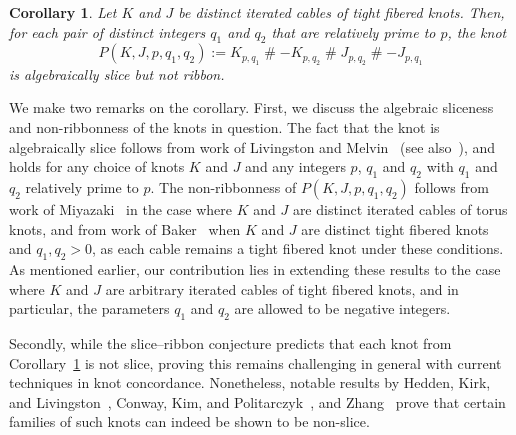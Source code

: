 \documentclass[11pt, reqno]{amsart}
\newtheorem{corollary}[theorem]{Corollary}
\theoremstyle{definition}
\theoremstyle{remark}
\numberwithin{equation}{section}
\begin{document}
\begin{corollary}\label{cor:examples}
Let $K$ and $J$ be distinct iterated cables of tight fibered knots. Then, for each pair of distinct integers $q_1$ and $q_2$ that are relatively prime to $p$, the knot
\[
P(K, J, p, q_1, q_2) := K_{p,q_1} \mathbin{\#} -K_{p,q_2} \mathbin{\#} J_{p,q_2} \mathbin{\#} -J_{p,q_1}
\]
is algebraically slice but not ribbon.
\end{corollary}




We make two remarks on the corollary. 
First, we discuss the algebraic sliceness and non-ribbonness of the knots in question. The fact that the knot is algebraically slice follows from work of Livingston and Melvin~\cite{Livingston-Melvin:1983} (see also~\cite{Kearton:1979}), and holds for any choice of knots $K$ and $J$ and any integers $p$,  $q_1$ and $q_2$ with $q_1$ and $q_2$ relatively prime to $p$.
The non-ribbonness of $P(K, J, p, q_1, q_2)$ follows from work of Miyazaki~\cite{Miyazaki:1994} in the case where $K$ and $J$ are distinct iterated cables of torus knots, and from work of Baker~\cite{Baker:2016} when $K$ and $J$ are distinct tight fibered knots and $q_1, q_2 > 0$, as each cable remains a tight fibered knot under these conditions.
As mentioned earlier, our contribution lies in extending these results to the case where $K$ and $J$ are arbitrary iterated cables of tight fibered knots, and in particular, the parameters $q_1$ and $q_2$ are allowed to be negative integers.





Secondly, while the slice--ribbon conjecture predicts that each knot from Corollary~\ref{cor:examples} is not slice, proving this remains challenging in general with current techniques in knot concordance. Nonetheless, notable results by Hedden, Kirk, and Livingston~\cite{Hedden-Kirk-Livingston:2012}, Conway, Kim, and Politarczyk~\cite{Conway-Kim-Politarczyk:2023}, and Zhang~\cite{Zhang} prove that certain families of such knots can indeed be shown to be non-slice.
\end{document}
